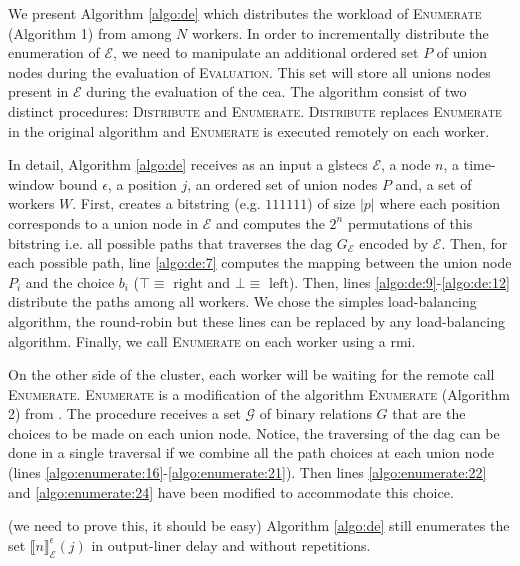 We present Algorithm \ref{algo:de} which distributes the workload of \textsc{Enumerate} (Algorithm 1) from \cite{core} among $N$ workers. In order to incrementally distribute the enumeration of $\mathcal{E}$, we need to manipulate an additional ordered set $P$ of union nodes during the evaluation of \textsc{Evaluation}. This set will store all unions nodes present in $\mathcal{E}$ during the evaluation of the \gls{cea}. The algorithm consist of two distinct procedures: \textsc{Distribute} and \textsc{Enumerate}. \textsc{Distribute} replaces \textsc{Enumerate} in the original algorithm and \textsc{Enumerate} is executed remotely on each worker.

In detail, Algorithm \ref{algo:de} receives as an input a gls{tecs} $\mathcal{E}$, a node $n$, a time-window bound $\epsilon$, a position $j$, an ordered set of union nodes $P$ and, a set of workers $W$. First, creates a bitstring (e.g. $111111$) of size $|p|$ where each position corresponds to a union node in $\mathcal{E}$ and computes the $2^{n}$ permutations of this bitstring i.e. all possible paths that traverses the \gls{dag} $G_{\mathcal{E}}$ encoded by $\mathcal{E}$. Then, for each possible path, line \ref{algo:de:7} computes the mapping between the union node $P_{i}$ and the choice $b_{i}$ ($\top \equiv \text{ right}$ and $\bot \equiv \text{ left}$). Then, lines \ref{algo:de:9}-\ref{algo:de:12} distribute the paths among all workers. We chose the simples load-balancing algorithm, the round-robin but these lines can be replaced by any load-balancing algorithm. Finally, we call \textsc{Enumerate} on each worker using a \gls{rmi}.

On the other side of the cluster, each worker will be waiting for the remote call \textsc{Enumerate}. \textsc{Enumerate} is a modification of the algorithm \textsc{Enumerate} (Algorithm 2) from \cite{core}. The procedure receives a set $\mathcal{G}$ of binary relations $G$ that are the choices to be made on each union node. Notice, the traversing of the \gls{dag} can be done in a single traversal if we combine all the path choices at each union node (lines \ref{algo:enumerate:16}-\ref{algo:enumerate:21}). Then lines \ref{algo:enumerate:22} and \ref{algo:enumerate:24} have been modified to accommodate this choice.

(we need to prove this, it should be easy) Algorithm \ref{algo:de} still enumerates the set ${\llbracket n \rrbracket}^{\epsilon}_{\mathcal{E}}(j)$ in output-liner delay and without repetitions.

